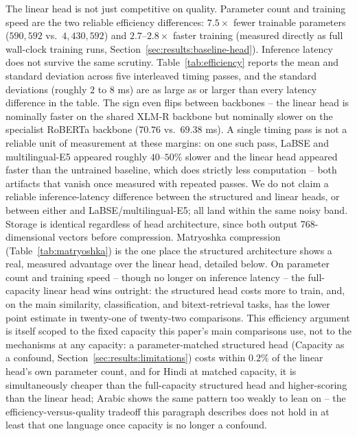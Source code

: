 \documentclass[manuscript]{acmart}
\begin{document}
The linear head is not just competitive on quality. Parameter count and training speed are the two reliable efficiency differences: $7.5\times$ fewer trainable parameters ($590{,}592$ vs.\ $4{,}430{,}592$) and $2.7$--$2.8\times$ faster training (measured directly as full wall-clock training runs, Section~\ref{sec:results:baseline-head}). Inference latency does not survive the same scrutiny. Table~\ref{tab:efficiency} reports the mean and standard deviation across five interleaved timing passes, and the standard deviations (roughly $2$ to $8$ ms) are as large as or larger than every latency difference in the table. The sign even flips between backbones -- the linear head is nominally faster on the shared XLM-R backbone but nominally slower on the specialist RoBERTa backbone ($70.76$ vs.\ $69.38$ ms). A single timing pass is not a reliable unit of measurement at these margins: on one such pass, LaBSE and multilingual-E5 appeared roughly $40$--$50\%$ slower and the linear head appeared faster than the untrained baseline, which does strictly less computation -- both artifacts that vanish once measured with repeated passes. We do not claim a reliable inference-latency difference between the structured and linear heads, or between either and LaBSE/multilingual-E5; all land within the same noisy band. Storage is identical regardless of head architecture, since both output 768-dimensional vectors before compression. Matryoshka compression (Table~\ref{tab:matryoshka}) is the one place the structured architecture shows a real, measured advantage over the linear head, detailed below. On parameter count and training speed -- though no longer on inference latency -- the full-capacity linear head wins outright: the structured head costs more to train, and, on the main similarity, classification, and bitext-retrieval tasks, has the lower point estimate in twenty-one of twenty-two comparisons. This efficiency argument is itself scoped to the fixed capacity this paper's main comparisons use, not to the mechanisms at any capacity: a parameter-matched structured head (Capacity as a confound, Section~\ref{sec:results:limitations}) costs within $0.2\%$ of the linear head's own parameter count, and for Hindi at matched capacity, it is simultaneously cheaper than the full-capacity structured head and higher-scoring than the linear head; Arabic shows the same pattern too weakly to lean on -- the efficiency-versus-quality tradeoff this paragraph describes does not hold in at least that one language once capacity is no longer a confound.
\end{document}
